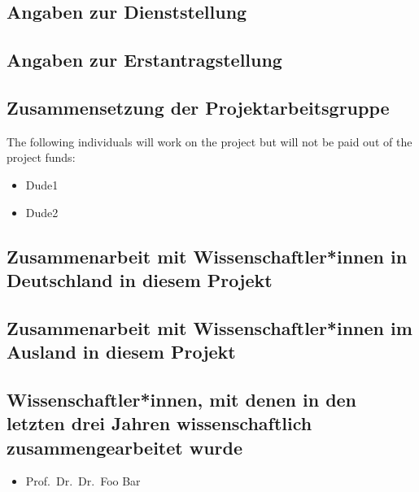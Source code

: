 \documentclass[ngerman]{scrartcl}
\begin{document}

\subsection{Angaben zur Dienststellung}

\subsection{Angaben zur Erstantragstellung}

\subsection{Zusammensetzung der Projektarbeitsgruppe}

The following individuals will work on the project but will not be paid out of the project funds:

\begin{itemize}
\item Dude1
\item Dude2
\end{itemize}

\subsection{Zusammenarbeit mit Wissenschaftler*innen in Deutschland in diesem Projekt}

\subsection{Zusammenarbeit mit Wissenschaftler*innen im Ausland in diesem Projekt}

\subsection{Wissenschaftler*innen, mit denen in den letzten drei Jahren wissenschaftlich zusammengearbeitet wurde}
\begin{itemize}
  \item Prof.\ Dr.\ Dr.\ Foo Bar
\end{itemize}
\end{document}
